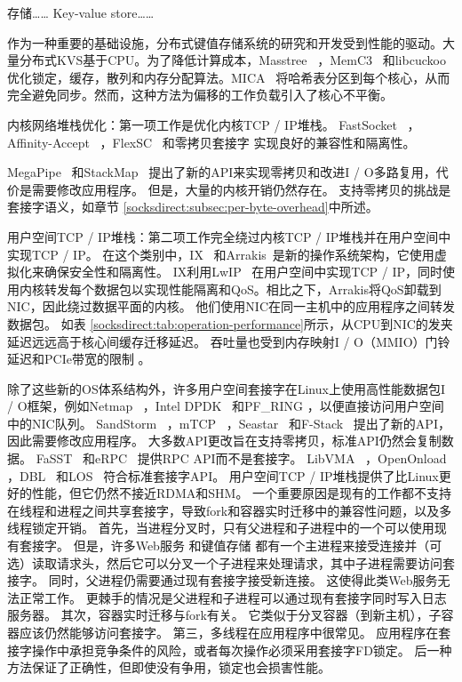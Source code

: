 存储……
Key-value store……


作为一种重要的基础设施，分布式键值存储系统的研究和开发受到性能的驱动。大量分布式KVS基于CPU。为了降低计算成本，Masstree~ \cite {mao2012cache}，MemC3~ \cite {fan2013memc3}和libcuckoo~ \cite {li2014algorithmic}优化锁定，缓存，散列和内存分配算法。MICA~ \cite {lim2014mica}将哈希表分区到每个核心，从而完全避免同步。然而，这种方法为偏移的工作负载引入了核心不平衡。


内核网络堆栈优化：第一项工作是优化内核TCP / IP堆栈。 FastSocket~ \cite {lin2016scalable}，Affinity-Accept~ \cite {pesterev2012improving}，FlexSC~ \cite {soares2010flexsc}和零拷贝套接字 \cite {thadani1995efficient,chu1996zero,linux-zero-copy}实现良好的兼容性和隔离性。

MegaPipe~ \cite {han2012megapipe}和StackMap~ \cite {yasukata2016stackmap}提出了新的API来实现零拷贝和改进I / O多路复用，代价是需要修改应用程序。
但是，大量的内核开销仍然存在。
支持零拷贝的挑战是套接字语义，如章节 \ref {socksdirect:subsec:per-byte-overhead}中所述。

用户空间TCP / IP堆栈：第二项工作完全绕过内核TCP / IP堆栈并在用户空间中实现TCP / IP。
在这个类别中，IX~ \cite {belay2017ix}和Arrakis~\cite {peter2016arrakis}是新的操作系统架构，它使用虚拟化来确保安全性和隔离性。 IX利用LwIP~ \cite {dunkels2001design}在用户空间中实现TCP / IP，同时使用内核转发每个数据包以实现性能隔离和QoS。相比之下，Arrakis将QoS卸载到NIC，因此绕过数据平面的内核。
他们使用NIC在同一主机中的应用程序之间转发数据包。
如表 \ref {socksdirect:tab:operation-performance}所示，从CPU到NIC的发夹延迟远远高于核心间缓存迁移延迟。
吞吐量也受到内存映射I / O（MMIO）门铃延迟和PCIe带宽的限制 \cite {neugebauer2018understanding,li2017kv}。

除了这些新的OS体系结构外，许多用户空间套接字在Linux上使用高性能数据包I / O框架，例如Netmap~ \cite {rizzo2012netmap}，Intel DPDK~ \cite {dpdk}和PF\_RING \cite {pf-ring}，以便直接访问用户空间中的NIC队列。
SandStorm~ \cite {marinos2014network}，mTCP~ \cite {jeong2014mtcp}，Seastar~ \cite {seastar}和F-Stack~ \cite {fstack}提出了新的API，因此需要修改应用程序。
大多数API更改旨在支持零拷贝，标准API仍然会复制数据。
FaSST~ \cite {kalia2016fasst}和eRPC~ \cite {kalia2018datacenter}提供RPC API而不是套接字。
LibVMA~ \cite {libvma}，OpenOnload~ \cite {openonload}，DBL~ \cite {dbl}和LOS~ \cite {huang2017high}符合标准套接字API。
用户空间TCP / IP堆栈提供了比Linux更好的性能，但它仍然不接近RDMA和SHM。
一个重要原因是现有的工作都不支持在线程和进程之间共享套接字，导致fork和容器实时迁移中的兼容性问题，以及多线程锁定开销。
首先，当进程分叉时，只有父进程和子进程中的一个可以使用现有套接字。
但是，许多Web服务 \cite {apache,nginx,php-fpm,python-gunicorn,vsftpd}和键值存储 \cite {memcached}都有一个主进程来接受连接并（可选）读取请求头，然后它可以分叉一个子进程来处理请求，其中子进程需要访问套接字。
同时，父进程仍需要通过现有套接字接受新连接。
这使得此类Web服务无法正常工作。
更棘手的情况是父进程和子进程可以通过现有套接字同时写入日志服务器。
其次，容器实时迁移与fork有关。
它类似于分叉容器（到新主机），子容器应该仍然能够访问套接字。
第三，多线程在应用程序中很常见。
应用程序在套接字操作中承担竞争条件的风险，或者每次操作必须采用套接字FD锁定。
后一种方法保证了正确性，但即使没有争用，锁定也会损害性能。



